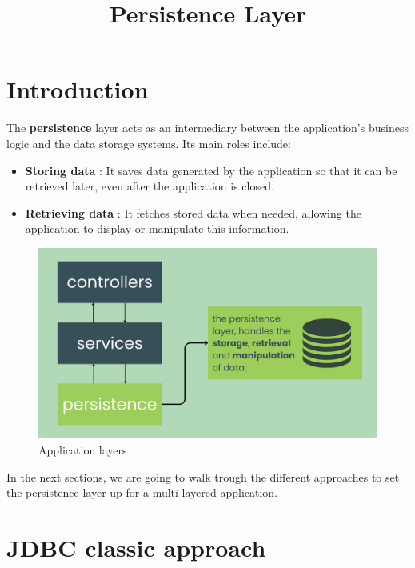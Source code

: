 \documentclass{article}
\title{Persistence Layer}
\begin{document}
\maketitle

\section{Introduction}
The \textbf{persistence} layer acts as an intermediary between the application's business logic and the data storage systems. Its main roles include:
\begin{itemize}
    
    \item \textbf{Storing data} : It saves data generated by the application so that it can be retrieved later, even after the application is closed.

    \item \textbf{Retrieving data} : It fetches stored data when needed, allowing the application to display or manipulate this information.
    
\end{itemize}

\begin{figure}[H]
    \centering
    \begin{framed}
        \includegraphics[width=0.8\linewidth]{images/persistence.png}
    \end{framed}
    \caption{Application layers}
    \label{fig:spring-logo}
\end{figure}

In the next sections, we are going to walk trough the different approaches to set the persistence layer up for a multi-layered application.


\section{JDBC classic approach}
\end{document}

